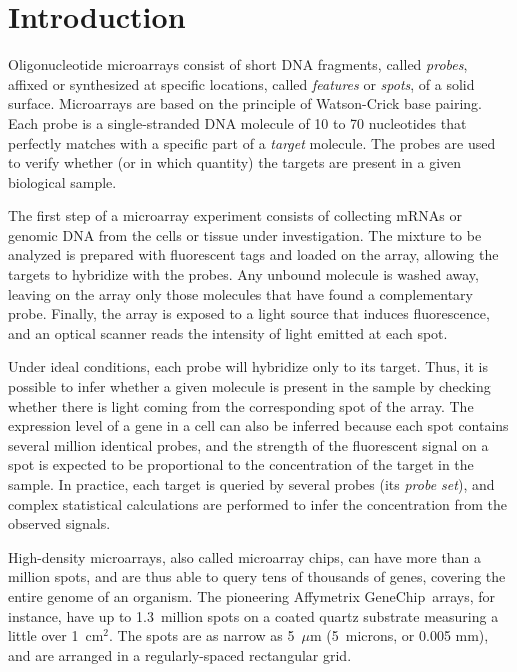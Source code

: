 \documentclass{w-edbk}
\newcommand{\ignore}[1]{}
\newcommand{\textR}{\raisebox{.6ex}{\scriptsize \textregistered}}
\begin{document}
\section{Introduction}
\label{sec:intro}

Oligonucleotide microarrays consist of short DNA fragments, called
\emph{probes}, affixed or synthesized at specific locations, called
\emph{features} or \emph{spots}, of a solid surface. Microarrays are
based on the principle of Watson-Crick base pairing. Each probe is a
single-stranded DNA molecule of 10 to 70 nucleotides that perfectly matches
with a specific part of a \emph{target} molecule. The probes are used to
verify whether (or in which quantity) the targets are present in a
given biological sample.

\ignore{
This type of microarray was originally designed in the late 1980s as a tool for
DNA sequencing, a technology that is known as DNA Sequencing by Hybridization.
}

The first step of a microarray experiment consists of collecting mRNAs
or genomic DNA from the cells or tissue under investigation. The mixture
to be analyzed is prepared with fluorescent tags and loaded on the array,
allowing
the targets to hybridize with the probes. Any unbound molecule is
washed away, leaving on the array only those molecules that have found
a complementary probe. Finally, the array is exposed to a light source
that induces fluorescence, and an optical scanner reads the intensity
of light emitted at each spot.

Under ideal conditions, each probe will hybridize only to its target.  Thus,
it is possible to infer whether a given molecule is present in the sample by
checking whether there is light coming from the corresponding spot of the
array.  The expression level of a gene in a cell can also be inferred because
each spot contains several million identical probes, and the strength of the
fluorescent signal on a spot is expected to be proportional to the
concentration of the target in the sample. In practice, each target is queried
by several probes (its \emph{probe set}), and complex statistical calculations
are performed to infer the concentration from the observed signals.

High-density microarrays, also called microarray chips, can have more than a
million spots, and are thus able to query tens of thousands of genes, covering
the entire genome of an organism.  The pioneering Affymetrix GeneChip\textR\ 
arrays, for instance, have up to 1.3~million spots on a coated quartz
substrate measuring a little over 1~cm$^2$.  The spots are as narrow as
5~$\mu$m (5~microns, or 0.005 mm), and are arranged in a regularly-spaced
rectangular grid.
\end{document}
